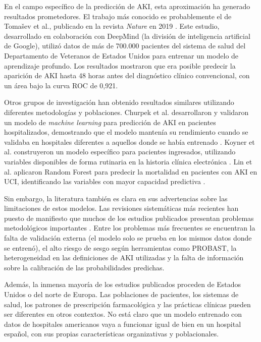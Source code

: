 \documentclass[12pt, a4paper, oneside]{report}
\begin{document}
En el campo específico de la predicción de AKI, esta aproximación ha generado resultados prometedores. El trabajo más conocido es probablemente el de Tomašev et al., publicado en la revista \textit{Nature} en 2019 \parencite{tomasev2019nature}. Este estudio, desarrollado en colaboración con DeepMind (la división de inteligencia artificial de Google), utilizó datos de más de 700.000 pacientes del sistema de salud del Departamento de Veteranos de Estados Unidos para entrenar un modelo de aprendizaje profundo. Los resultados mostraron que era posible predecir la aparición de AKI hasta 48 horas antes del diagnóstico clínico convencional, con un área bajo la curva ROC de 0,921.

Otros grupos de investigación han obtenido resultados similares utilizando diferentes metodologías y poblaciones. Churpek et al. desarrollaron y validaron un modelo de \textit{machine learning} para predicción de AKI en pacientes hospitalizados, demostrando que el modelo mantenía su rendimiento cuando se validaba en hospitales diferentes a aquellos donde se había entrenado \parencite{churpek2020validation}. Koyner et al. construyeron un modelo específico para pacientes ingresados, utilizando variables disponibles de forma rutinaria en la historia clínica electrónica \parencite{koyner2018ml}. Lin et al. aplicaron Random Forest para predecir la mortalidad en pacientes con AKI en UCI, identificando las variables con mayor capacidad predictiva \parencite{lin2019randomforest}.

Sin embargo, la literatura también es clara en sus advertencias sobre las limitaciones de estos modelos. Las revisiones sistemáticas más recientes han puesto de manifiesto que muchos de los estudios publicados presentan problemas metodológicos importantes \parencite{rank2022mlaki, shi2025aiaki}. Entre los problemas más frecuentes se encuentran la falta de validación externa (el modelo solo se prueba en los mismos datos donde se entrenó), el alto riesgo de sesgo según herramientas como PROBAST, la heterogeneidad en las definiciones de AKI utilizadas y la falta de información sobre la calibración de las probabilidades predichas.

Además, la inmensa mayoría de los estudios publicados proceden de Estados Unidos o del norte de Europa. Las poblaciones de pacientes, los sistemas de salud, los patrones de prescripción farmacológica y las prácticas clínicas pueden ser diferentes en otros contextos. No está claro que un modelo entrenado con datos de hospitales americanos vaya a funcionar igual de bien en un hospital español, con sus propias características organizativas y poblacionales.
\end{document}
